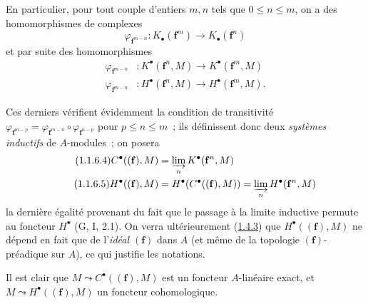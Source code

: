 \begin{env}[1.1.6]
\label{III.1.1.6-fr}
En particulier, pour tout couple d'entiers $m,n$ tels que $0\leq n\leq m$,
on a des homomorphismes de complexes
\begin{equation}
\label{III.1.1.6.1-fr}
\tag{1.1.6.1}
\varphi_{\mathbf f^{m-n}}:K_\bullet(\mathbf f^m)\longrightarrow
K_\bullet(\mathbf f^n)
\end{equation}
et par suite des homomorphismes
\begin{align}
\label{III.1.1.6.2-fr}
\tag{1.1.6.2}
\varphi_{\mathbf f^{m-n}} &:K^\bullet(\mathbf f^n,M)\longrightarrow
K^\bullet(\mathbf f^m,M)\\
\label{III.1.1.6.3-fr}
\tag{1.1.6.3}
\varphi_{\mathbf f^{m-n}} &:H^\bullet(\mathbf f^n,M)\longrightarrow
H^\bullet(\mathbf f^m,M).
\end{align}

Ces derniers vérifient évidemment la condition de transitivité
$\varphi_{\mathbf f^{m-p}}=
\varphi_{\mathbf f^{m-n}}\circ\varphi_{\mathbf f^{n-p}}$ pour $p\leq n\leq m$~;
ils définissent donc deux \emph{systèmes inductifs} de $A$-modules~; on posera
\begin{align}
\label{III.1.1.6.4-fr}
\tag{1.1.6.4}
C^\bullet((\mathbf f),M)&=\varinjlim_n K^\bullet(\mathbf f^n,M)\\
\label{III.1.1.6.5-fr}
\tag{1.1.6.5}
H^\bullet((\mathbf f),M)&=H^\bullet(C^\bullet((\mathbf f),M))
=\varinjlim_n H^\bullet(\mathbf f^n,M)
\end{align}
la dernière égalité provenant du fait que le passage à la limite inductive
permute au foncteur $H^\bullet$ (G, I, 2.1). On verra ultérieurement
(\hyperref[III.1.4.3-fr]{1.4.3}) que $H^\bullet((\mathbf f),M)$ ne dépend en
fait que de l'\emph{idéal $(\mathbf f)$} dans $A$ (et même de la topologie
$(\mathbf f)$-préadique sur $A$), ce qui justifie les notations.

Il est clair que $M\leadsto C^\bullet((\mathbf f),M)$ est un foncteur
$A$-linéaire exact, et $M\leadsto H^\bullet((\mathbf f),M)$ un foncteur
cohomologique.
\end{env}

